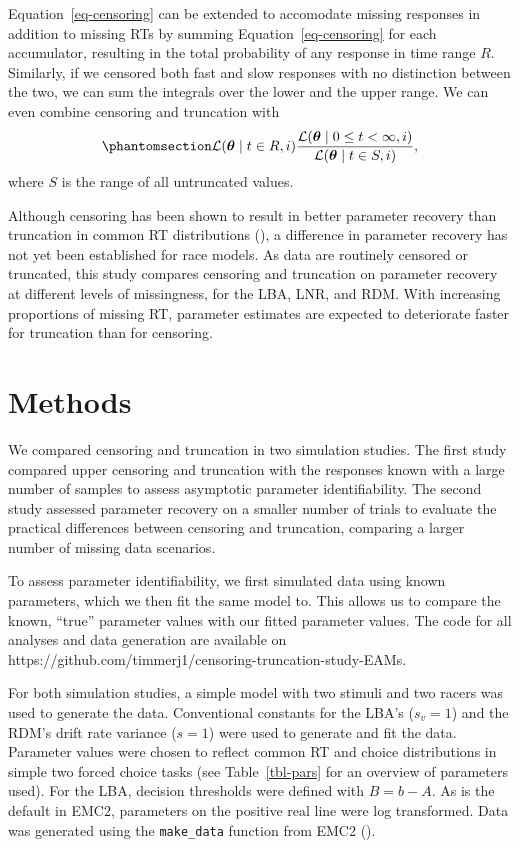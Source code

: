 \documentclass[
  man,
  floatsintext,
  longtable,
  nolmodern,
  notxfonts,
  notimes,
  colorlinks=true,linkcolor=blue,citecolor=blue,urlcolor=blue]{apa7}
\begin{document}
Equation~\ref{eq-censoring} can be extended to accomodate missing
responses in addition to missing RTs by summing
Equation~\ref{eq-censoring} for each accumulator, resulting in the total
probability of any response in time range \(R\). Similarly, if we
censored both fast and slow responses with no distinction between the
two, we can sum the integrals over the lower and the upper range. We can
even combine censoring and truncation with
\begin{equation}\phantomsection\label{eq-censoringandtruncation}{
\mathcal{L}(\boldsymbol{\theta} \mid t \in R, i) \frac{\mathcal{L}(\boldsymbol{\theta} \mid 0 \leq t < \infty, i)}{\mathcal{L}(\boldsymbol{\theta} \mid t \in S, i)},
}\end{equation} where \(S\) is the range of all untruncated values.

Although censoring has been shown to result in better parameter recovery
than truncation in common RT distributions
(), a difference in
parameter recovery has not yet been established for race models. As data
are routinely censored or truncated, this study compares censoring and
truncation on parameter recovery at different levels of missingness, for
the LBA, LNR, and RDM. With increasing proportions of missing RT,
parameter estimates are expected to deteriorate faster for truncation
than for censoring.

\section{Methods}\label{methods}

We compared censoring and truncation in two simulation studies. The
first study compared upper censoring and truncation with the responses
known with a large number of samples to assess asymptotic parameter
identifiability. The second study assessed parameter recovery on a
smaller number of trials to evaluate the practical differences between
censoring and truncation, comparing a larger number of missing data
scenarios.

To assess parameter identifiability, we first simulated data using known
parameters, which we then fit the same model to. This allows us to
compare the known, ``true'' parameter values with our fitted parameter
values. The code for all analyses and data generation are available on
https://github.com/timmerj1/censoring-truncation-study-EAMs.

For both simulation studies, a simple model with two stimuli and two
racers was used to generate the data. Conventional constants for the
LBA's (\(s_v = 1\)) and the RDM's drift rate variance (\(s = 1\)) were
used to generate and fit the data. Parameter values were chosen to
reflect common RT and choice distributions in simple two forced choice
tasks (see Table~\ref{tbl-pars} for an overview of parameters used). For
the LBA, decision thresholds were defined with \(B = b - A\). As is the
default in EMC2, parameters on the positive real line were log
transformed. Data was generated using the \texttt{make\_data} function
from EMC2 ().
\end{document}
